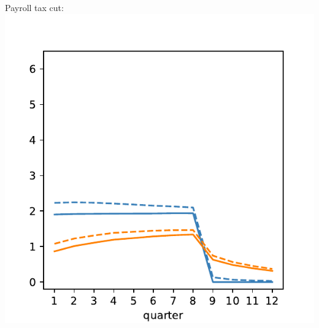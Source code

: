 \documentclass[pdflatex,aspectratio=169]{beamer}
\begin{document}
{\begin{frame}
\begin{columns}
      \begin{column}{0.33\textwidth}
        \footnotesize Payroll tax cut:
        \includegraphics[width=1.2\linewidth]{Code/HA-Models/FromPandemicCode/Figures/recession_taxcut_relrecession}
      \end{column}
    \end{columns}

  \end{frame}
}{}
\end{document}
